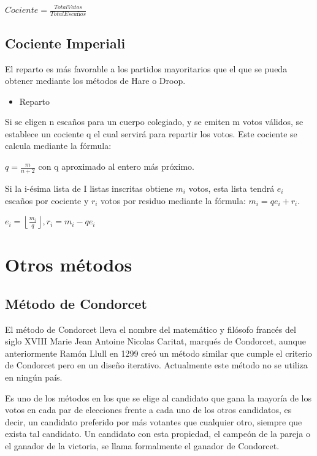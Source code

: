 \documentclass[12pt,a4paper,]{book}
\providecommand{\tightlist}{%
  \setlength{\itemsep}{0pt}\setlength{\parskip}{0pt}}
\numberwithin{dummy}{section}
\theoremstyle{ocrenumbox}
\theoremstyle{blacknumex}
\theoremstyle{blacknumbox}
\theoremstyle{ocrenum}
\theoremstyle{ocrenum}
\begin{document}
\(Cociente = \frac{Total Votos}{Total Escaños}\)

\hypertarget{cociente-imperiali}{%
\subsection{Cociente Imperiali}\label{cociente-imperiali}}

El reparto es más favorable a los partidos mayoritarios que el que se
pueda obtener mediante los métodos de Hare o Droop.

\begin{itemize}
\tightlist
\item
  Reparto
\end{itemize}

Si se eligen n escaños para un cuerpo colegiado, y se emiten m votos
válidos, se establece un cociente q el cual servirá para repartir los
votos. Este cociente se calcula mediante la fórmula:

\({q={\frac {m}{n+2}}}\) con q aproximado al entero más próximo.

Si la i-ésima lista de I listas inscritas obtiene \({m_{i}}\) votos,
esta lista tendrá \({e_{i}}\) escaños por cociente y \({r_{i}}\) votos
por residuo mediante la fórmula: \({m_{i}=qe_{i}+r_{i}}\).

\({e_{i}=\left\lfloor {\frac {m_{i}}{q}}\right\rfloor ,r_{i}=m_{i}-qe_{i}}\)

\hypertarget{otros-muxe9todos}{%
\section{Otros métodos}\label{otros-muxe9todos}}

\hypertarget{muxe9todo-de-condorcet}{%
\subsection{Método de Condorcet}\label{muxe9todo-de-condorcet}}

El método de Condorcet lleva el nombre del matemático y filósofo francés
del siglo XVIII Marie Jean Antoine Nicolas Caritat, marqués de
Condorcet, aunque anteriormente Ramón Llull en 1299 creó un método
similar que cumple el criterio de Condorcet pero en un diseño iterativo.
Actualmente este método no se utiliza en ningún país.

Es uno de los métodos en los que se elige al candidato que gana la
mayoría de los votos en cada par de elecciones frente a cada uno de los
otros candidatos, es decir, un candidato preferido por más votantes que
cualquier otro, siempre que exista tal candidato. Un candidato con esta
propiedad, el campeón de la pareja o el ganador de la victoria, se llama
formalmente el ganador de Condorcet.
\end{document}
